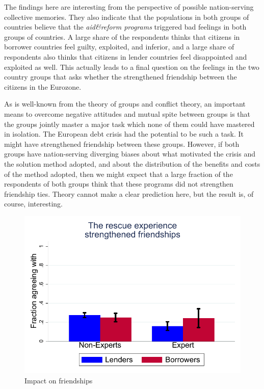 The findings here are interesting from the perspective of possible
nation-serving collective memories. They also indicate that the populations
in both groups of countries believe that the \textit{aid\&reform programs} triggered
bad feelings in both groups of countries. A large share of the respondents
thinks that citizens in borrower countries feel guilty, exploited, and
inferior, and a large share of respondents also thinks that citizens in
lender countries feel disappointed and exploited as well. This actually
leads to a final question on the feelings in the two country groups that
asks whether the  strengthened friendship between the
citizens in the Eurozone. 

As is well-known from the theory of groups and conflict theory, an important
means to overcome negative attitudes and mutual spite between groups is that
the groups jointly master a major task which none of them could have
mastered in isolation. The European debt crisis had the potential to be 
such a task. It might have strengthened friendship between these groups.
However, if both groups have nation-serving diverging biases about what
motivated the crisis and the solution method adopted, and about the
distribution of the benefits and costs of the method adopted, then we might
expect that a large fraction of the respondents of both groups think that
these programs did not strengthen friendship ties. Theory cannot make a
clear prediction here, but the result is, of course, interesting.
\begin{figure}
\centering
\caption{Impact on friendships}
\includegraphics[scale=0.5]{graph5_3.pdf}
\end{figure}

